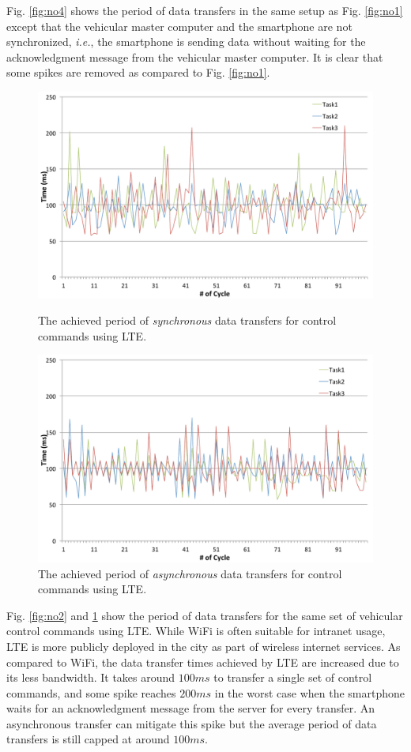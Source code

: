 Fig. \ref{fig:no4} shows the period of data transfers in the same
setup as Fig. \ref{fig:no1} except that the vehicular master computer and
the smartphone are not synchronized, \textit{i.e.}, the smartphone is
sending data without waiting for the acknowledgment message from the
vehicular master computer.
It is clear that some spikes are removed as compared to
Fig. \ref{fig:no1}.

\begin{figure}[!t]
 \centering
 \includegraphics[width=0.8\hsize]{fig/No2_Andrive_serv_cycle_LTE.pdf}
 \caption{The achieved period of \textit{synchronous} data transfers for
 control commands using LTE.}
 \label{fig:no2}
 \vspace{1em}
 \includegraphics[width=0.8\hsize]{fig/No5_Andrive_serv_cycle_LTE_only_send.pdf}
 \caption{The achieved period of \textit{asynchronous} data transfers for
 control commands using LTE.}
 \label{fig:no5}
\end{figure}

Fig. \ref{fig:no2} and \ref{fig:no5} show the period of data transfers
for the same set of vehicular control commands using LTE.
While WiFi is often suitable for intranet usage, LTE is more publicly
deployed in the city as part of wireless internet services.
As compared to WiFi, the data transfer times achieved by LTE are
increased due to its less bandwidth.
It takes around $100ms$ to transfer a single set of control commands,
and some spike reaches $200ms$ in the worst case when the smartphone
waits for an acknowledgment message from the server for every
transfer.
An asynchronous transfer can mitigate this spike but the average period
of data transfers is still capped at around $100ms$.

